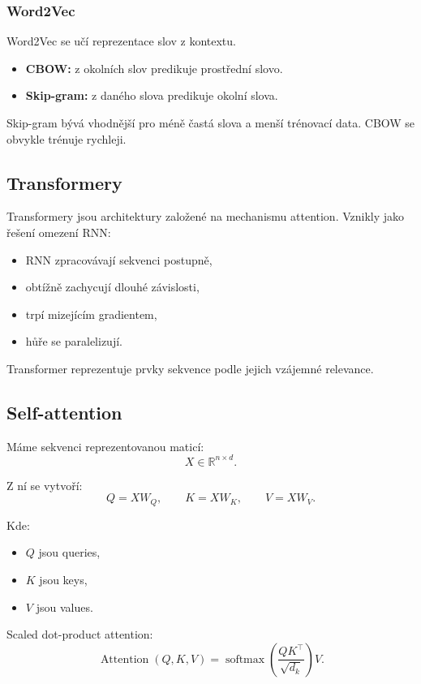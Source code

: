 \subsubsection{Word2Vec}

Word2Vec se učí reprezentace slov z kontextu.

\begin{itemize}
    \item \textbf{CBOW:}
    z okolních slov predikuje prostřední slovo.
    
    \item \textbf{Skip-gram:}
    z daného slova predikuje okolní slova.
\end{itemize}

Skip-gram bývá vhodnější pro méně častá slova a menší trénovací data. CBOW se obvykle trénuje rychleji.

\subsection{Transformery}

Transformery jsou architektury založené na mechanismu attention. Vznikly jako řešení omezení RNN:
\begin{itemize}
    \item RNN zpracovávají sekvenci postupně,
    \item obtížně zachycují dlouhé závislosti,
    \item trpí mizejícím gradientem,
    \item hůře se paralelizují.
\end{itemize}

Transformer reprezentuje prvky sekvence podle jejich vzájemné relevance.

\subsection{Self-attention}

Máme sekvenci reprezentovanou maticí:
\[
X\in \mathbb{R}^{n\times d}.
\]

Z ní se vytvoří:
\[
Q=XW_Q,
\qquad
K=XW_K,
\qquad
V=XW_V.
\]

Kde:
\begin{itemize}
    \item $Q$ jsou queries,
    \item $K$ jsou keys,
    \item $V$ jsou values.
\end{itemize}

Scaled dot-product attention:
\[
\operatorname{Attention}(Q,K,V)
=
\operatorname{softmax}
\left(
\frac{QK^\top}{\sqrt{d_k}}
\right)
V.
\]

